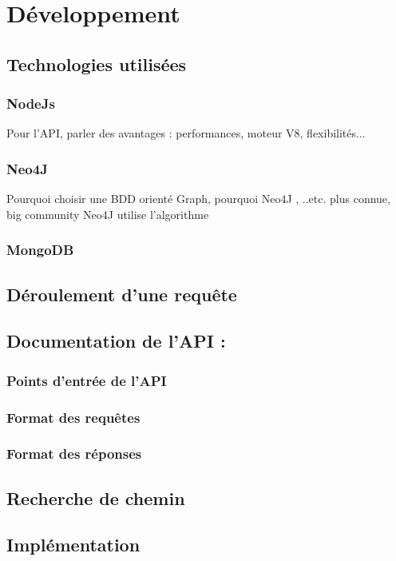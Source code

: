 	\chapter{Développement}
		\section{Technologies utilisées}
		\subsection{NodeJs}
			Pour l'API, parler des avantages : performances, moteur V8, flexibilités...  
		\subsection{Neo4J}
			Pourquoi choisir une BDD orienté Graph, pourquoi Neo4J , ..etc.
			plus connue, big community
			Neo4J utilise l'algorithme 
		\subsection{MongoDB}
		
	\section{Déroulement d'une requête}
	
	\section{Documentation de l'API :}
		\subsection{Points d'entrée de l'API}
		\subsection{Format des requêtes}
		\subsection{Format des réponses}
	\section{Recherche de chemin}
	
	\section{Implémentation}